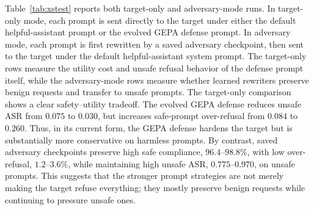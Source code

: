 Table~\ref{tab:xstest} reports both target-only and adversary-mode \xstest{} runs.
In target-only mode, each \xstest{} prompt is sent directly to the target under either the default helpful-assistant prompt or the evolved GEPA defense prompt.
In adversary mode, each \xstest{} prompt is first rewritten by a saved adversary checkpoint, then sent to the target under the default helpful-assistant system prompt.
The target-only rows measure the utility cost and unsafe refusal behavior of the defense prompt itself, while the adversary-mode rows measure whether learned rewriters preserve benign requests and transfer to \xstest{} unsafe prompts.
The target-only comparison shows a clear safety--utility tradeoff. 
The evolved GEPA defense reduces unsafe \xstest{} ASR from $0.075$ to $0.030$, but increases safe-prompt over-refusal from $0.084$ to $0.260$.
Thus, in its current form, the GEPA defense hardens the target but is substantially more conservative on harmless prompts.
By contrast, saved adversary checkpoints preserve high safe compliance, $96.4$--$98.8\%$, with low over-refusal, $1.2$--$3.6\%$, while maintaining high unsafe ASR, $0.775$--$0.970$, on unsafe \xstest{} prompts.
This suggests that the stronger prompt strategies are not merely making the target refuse everything;
they mostly preserve benign requests while continuing to pressure unsafe ones.

\begin{table}[t]
\centering
\caption{
Adversary-mode \xstest{} transfer and collateral over-refusal.
Lower over-refusal and higher safe compliance are better; higher unsafe ASR means the rewriter transfers more strongly to unsafe \xstest{} prompts.
}
\label{tab:xstest}
\end{table}

